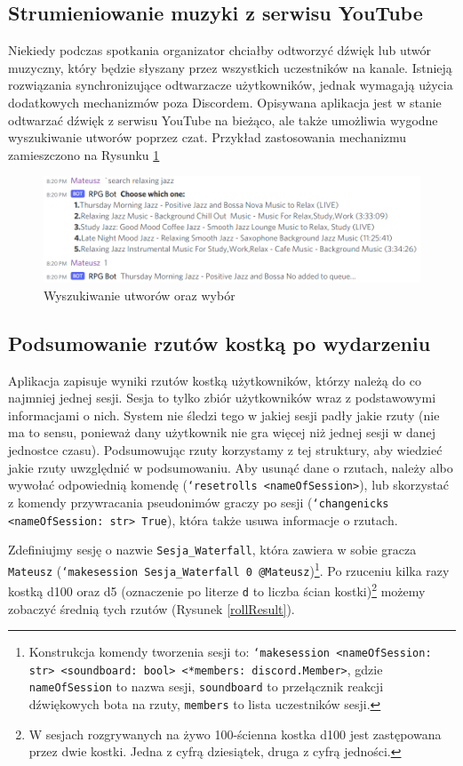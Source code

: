 \documentclass[shortabstract,inz]{iithesis}
\begin{document}
			\subsection{Strumieniowanie muzyki z serwisu YouTube}
			Niekiedy podczas spotkania organizator chciałby odtworzyć dźwięk lub utwór muzyczny, który będzie słyszany przez wszystkich uczestników na kanale. Istnieją rozwiązania synchronizujące odtwarzacze użytkowników, jednak wymagają użycia dodatkowych mechanizmów poza Discordem. Opisywana aplikacja jest w stanie odtwarzać dźwięk z serwisu YouTube na bieżąco, ale także umożliwia wygodne wyszukiwanie utworów poprzez czat. Przykład zastosowania mechanizmu zamieszczono na Rysunku \ref{musicBotSearch}
	
			\begin{figure}[h!]
					\includegraphics[width=1\textwidth]{musicExample}
					\caption{Wyszukiwanie utworów oraz wybór}
					\label{musicBotSearch}
			\end{figure}
	
			\subsection{Podsumowanie rzutów kostką po wydarzeniu}
			Aplikacja zapisuje wyniki rzutów kostką użytkowników, którzy należą do co najmniej jednej sesji. Sesja to tylko zbiór użytkowników wraz z podstawowymi informacjami o nich. System nie śledzi tego w jakiej sesji padły jakie rzuty (nie ma to sensu, ponieważ dany użytkownik nie gra więcej niż jednej sesji w danej jednostce czasu). Podsumowując rzuty korzystamy z tej struktury, aby wiedzieć jakie rzuty uwzględnić w podsumowaniu. Aby usunąć dane o rzutach, należy albo wywołać odpowiednią komendę (\texttt{`resetrolls <nameOfSession>}), lub skorzystać z komendy przywracania pseudonimów graczy po sesji (\texttt{`changenicks <nameOfSession: str> True}), która także usuwa informacje o rzutach.
			
			Zdefiniujmy sesję o nazwie \texttt{Sesja\_Waterfall}, która zawiera w sobie gracza \texttt{Mateusz} (\texttt{`makesession Sesja\_Waterfall 0 @Mateusz})\footnote{Konstrukcja komendy tworzenia sesji to: \texttt{`makesession <nameOfSession: str> <soundboard: bool> <*members: discord.Member>}, gdzie \texttt{nameOfSession} to nazwa sesji, \texttt{soundboard} to przełącznik reakcji dźwiękowych bota na rzuty, \texttt{members} to lista uczestników sesji.}. Po rzuceniu kilka razy kostką d100 oraz d5 (oznaczenie po literze \texttt{d} to liczba ścian kostki)\footnote{W sesjach rozgrywanych na żywo 100-ścienna kostka d100 jest zastępowana przez dwie kostki. Jedna z cyfrą dziesiątek, druga z cyfrą jedności.} możemy zobaczyć średnią tych rzutów (Rysunek \ref{rollResult}).
			
\end{document}
